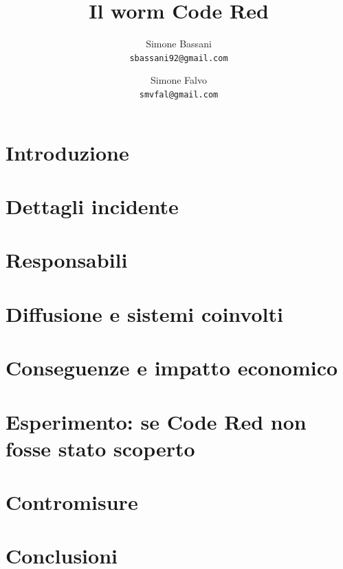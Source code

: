 \documentclass[a4paper,titlepage]{article}
\begin{document}
\title{
Il worm Code Red
}
\author{
  Simone Bassani\\
  \texttt{sbassani92@gmail.com}
  \and
  Simone Falvo\\
  \texttt{smvfal@gmail.com}
}

\date{}


\maketitle

%

\tableofcontents
\newpage

\section{Introduzione}


\section{Dettagli incidente}


\section{Responsabili}


\section{Diffusione e sistemi coinvolti}


\section{Conseguenze e impatto economico}


\section{Esperimento: se Code Red non fosse stato scoperto}


\section{Contromisure}


\section{Conclusioni}



\end{document}
